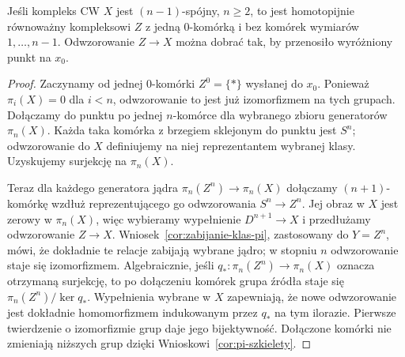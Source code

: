 \begin{lemat}
\label{lem:model-wysoko-spojny}
Jeśli kompleks CW $X$
jest $(n-1)$-spójny,
$n\geq2$, to jest
homotopijnie równoważny
kompleksowi $Z$ z
jedną $0$-komórką
i bez komórek
wymiarów $1,\ldots,n-1$.
Odwzorowanie $Z\to X$
można dobrać tak,
by przenosiło
wyróżniony punkt
na $x_0$.
\end{lemat}
\begin{proof}
Zaczynamy od jednej
$0$-komórki $Z^0=\{*\}$
wysłanej do $x_0$.
Ponieważ $\pi_i(X)=0$
dla $i<n$, odwzorowanie to
jest już izomorfizmem
na tych grupach.
Dołączamy do punktu
po jednej $n$-komórce
dla wybranego zbioru
generatorów $\pi_n(X)$.
Każda taka komórka
z brzegiem sklejonym
do punktu jest $S^n$;
odwzorowanie do $X$ definiujemy
na niej reprezentantem
wybranej klasy.
Uzyskujemy surjekcję
na $\pi_n(X)$.

Teraz dla każdego
generatora jądra
$\pi_n(Z^n)\to\pi_n(X)$
dołączamy $(n+1)$-komórkę
wzdłuż reprezentującego
go odwzorowania $S^n\to Z^n$.
Jej obraz w $X$
jest zerowy w $\pi_n(X)$,
więc wybieramy
wypełnienie $D^{n+1}\to X$
i przedłużamy odwzorowanie
$Z\to X$.
Wniosek~\ref{cor:zabijanie-klas-pi}, zastosowany do $Y=Z^n$,
mówi, że dokładnie te relacje zabijają wybrane jądro; w
stopniu $n$ odwzorowanie
staje się izomorfizmem.
Algebraicznie, jeśli $q_*:\pi_n(Z^n)\to\pi_n(X)$ oznacza
otrzymaną surjekcję, to po dołączeniu komórek grupa źródła
staje się $\pi_n(Z^n)/\ker q_*$. Wypełnienia wybrane w $X$
zapewniają, że nowe odwzorowanie jest dokładnie homomorfizmem
indukowanym przez $q_*$ na tym ilorazie. Pierwsze twierdzenie
o izomorfizmie grup daje jego bijektywność.
Dołączone komórki
nie zmieniają niższych
grup dzięki
Wnioskowi~\ref{cor:pi-szkielety}.


\end{proof}
